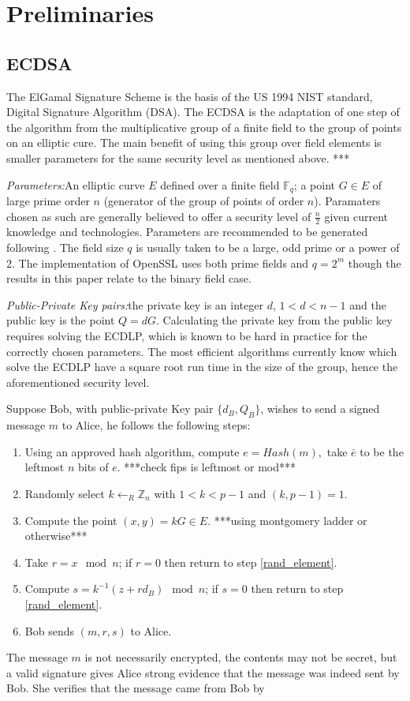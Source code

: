 \documentclass{llncs}
\newcommand{\F}{{\mathbb F}}
\newcommand{\Z}{{\mathbb Z}}
\begin{document}
\section{Preliminaries}\label{sec:background}

\subsection{ECDSA}\label{sub:ecdsa}

The ElGamal Signature Scheme is the basis of the US 1994 NIST standard, Digital Signature Algorithm (DSA). The ECDSA is the adaptation of one step of the algorithm from the multiplicative group of a finite field to the group of points on an elliptic cure. The main benefit of using this group over field elements is smaller parameters for the same security level as mentioned above. ***

\emph{Parameters:}\quad An elliptic curve $E$ defined over a finite field $\F_{q}$; a point $G\in E$ of large prime order $n$ (generator of the group of points of order $n$). Paramaters chosen as such are generally believed to offer a security level of $\frac{n}{2}$ given current knowledge and technologies. Parameters are recommended to be generated following \cite{fips}. The field size $q$ is usually taken to be a large, odd prime or a power of $2$. The implementation of OpenSSL uses both prime fields and $q=2^m$ though the results in this paper relate to the binary field case.

\emph{Public-Private Key pairs:}\quad the private key is an integer $d$, $1<d<n-1$ and the public key is the point $Q=dG$. Calculating the private key from the public key requires solving the ECDLP, which is known to be hard in practice for the correctly chosen parameters. The most efficient algorithms currently know which solve the ECDLP have a square root run time in the size of the group, hence the aforementioned security level.
\vspace{0.5cm}

Suppose Bob, with public-private Key pair $\{d_B,Q_B\}$, wishes to send a signed message $m$ to Alice, he follows the following steps:
\begin{enumerate}
\item Using an approved hash algorithm, compute $e=Hash(m),$ take $\bar{e}$ to be the leftmost $n$ bits of $e$. ***check fips is leftmost or mod***
\item\label{rand_element} Randomly select $k\leftarrow_R\Z_n$ with $1<k<p-1$ and $(k,p-1)=1$.
\item Compute the point $(x,y)=kG\in E$. ***using montgomery ladder or otherwise***
\item Take $r=x\mod n$; if $r=0$ then return to step \ref{rand_element}.
\item Compute $s=k^{-1}(z+rd_B)\mod n$; if $s=0$ then return to step \ref{rand_element}.
\item Bob sends $(m,r,s)$ to Alice.
\end{enumerate}
The message $m$ is not necessarily encrypted, the contents may not be secret, but a valid signature gives Alice strong evidence that the message was indeed sent by Bob. She verifies that the message came from Bob by 
\end{document}
